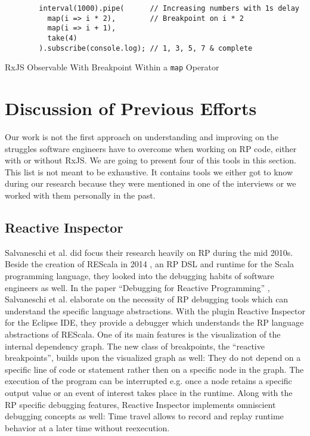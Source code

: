 \documentclass[12pt,a4paper]{article}
\begin{document}
\begin{listing}[H]
	\begin{verbatim}
		interval(1000).pipe(      // Increasing numbers with 1s delay
		  map(i => i * 2),        // Breakpoint on i * 2
		  map(i => i + 1),
		  take(4)
		).subscribe(console.log); // 1, 3, 5, 7 & complete
	\end{verbatim}
	\caption{RxJS Observable With Breakpoint Within a \texttt{map} Operator}
	\label{lst:rxjs-step-controls}
\end{listing}


\section{Discussion of Previous Efforts}
\label{sec:discussion}

Our work is not the first approach on understanding and improving on the struggles software engineers have to overcome when working on RP code, either with or without RxJS. We are going to present four of this tools in this section. This list is not meant to be exhaustive. It contains tools we either got to know during our research because they were mentioned in one of the interviews or we worked with them personally in the past.

\subsection{Reactive Inspector}

Salvaneschi et al. did focus their research heavily on RP during the mid 2010s. Beside the creation of REScala in 2014 \cite{10.1145/2577080.2577083}, an RP DSL and runtime for the Scala programming language, they looked into the debugging habits of software engineers as well. In the paper ``Debugging for Reactive Programming'' \cite{10.1145/2884781.2884815}, Salvaneschi et al. elaborate on the necessity of RP debugging tools which can understand the specific language abstractions. With the plugin Reactive Inspector for the Eclipse IDE, they provide a debugger which understands the RP language abstractions of REScala. One of its main features is the visualization of the internal dependency graph. The new class of  breakpoints, the ``reactive breakpoints'', builds upon the visualized graph as well: They do not depend on a specific line of code or statement rather then on a specific node in the graph. The execution of the program can be interrupted e.g. once a node retains a specific output value or an event of interest takes place in the runtime. Along with the RP specific debugging features, Reactive Inspector implements omniscient debugging concepts as well: Time travel allows to record and replay runtime behavior at a later time without reexecution.
\end{document}
